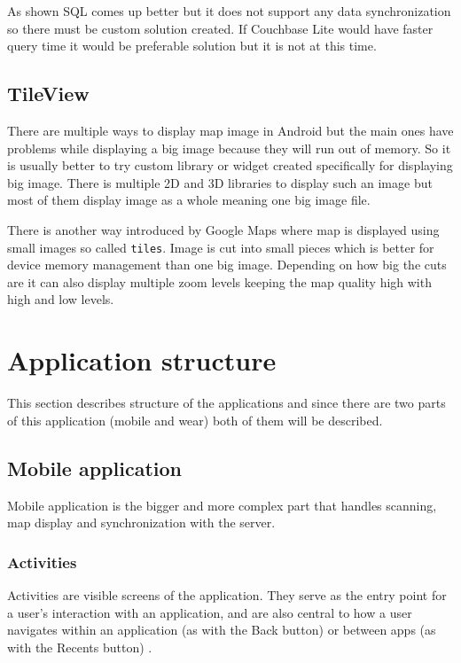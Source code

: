 As shown SQL comes up better but it does not support any data synchronization so there must be custom solution created. If Couchbase Lite would have faster query time it would be preferable solution but it is not at this time.

\subsection{TileView}\label{subsec:TileView}
There are multiple ways to display map image in Android but the main ones have problems while displaying a big image because they will run out of memory. So it is usually better to try custom library or widget created specifically for displaying big image. There is multiple 2D and 3D libraries to display such an image but most of them display image as a whole meaning one big image file. 

There is another way introduced by Google Maps where map is displayed using small images so called \verb|tiles|. Image is cut into small pieces which is better for device memory management than one big image. Depending on how big the cuts are it can also display multiple zoom levels keeping the map quality high with high and low levels.


\section{Application structure}\label{sec:ApplicationStructure}
This section describes structure of the applications and since there are two parts of this application (mobile and wear) both of them will be described.

\subsection{Mobile application}\label{subsec:MobileApplication}
Mobile application is the bigger and more complex part that handles scanning, map display and synchronization with the server.

\subsubsection{Activities}\label{subsec:Activities}
Activities are visible screens of the application. They serve as the entry point for a user's interaction with an application, and are also central to how a user navigates within an application (as with the Back button) or between apps (as with the Recents button) \cite{AD}.

